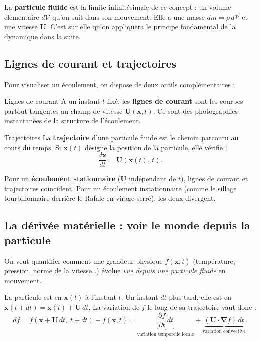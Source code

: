 \documentclass[11pt,a4paper]{report}
\newcommand{\pd}[2]{\dfrac{\partial #1}{\partial #2}}
\begin{document}
La \textbf{particule fluide} est la limite infinitésimale de ce concept : un volume
élémentaire $d\mathcal{V}$ qu'on suit dans son mouvement. Elle a une masse
$dm = \rho\,d\mathcal{V}$ et une vitesse $\bm{U}$. C'est sur elle qu'on appliquera
le principe fondamental de la dynamique dans la suite.

\subsection{Lignes de courant et trajectoires}

Pour visualiser un écoulement, on dispose de deux outils complémentaires :

\begin{defbox}{Lignes de courant}
À un instant $t$ fixé, les \textbf{lignes de courant} sont les courbes partout
tangentes au champ de vitesse $\bm{U}(\bm{x},t)$. Ce sont des photographies
instantanées de la structure de l'écoulement.
\end{defbox}

\begin{defbox}{Trajectoires}
La \textbf{trajectoire} d'une particule fluide est le chemin parcouru au cours du
temps. Si $\bm{x}(t)$ désigne la position de la particule, elle vérifie :
\[
    \frac{d\bm{x}}{dt} = \bm{U}\!\left(\bm{x}(t),\, t\right).
\]
\end{defbox}

Pour un \textbf{écoulement stationnaire} ($\bm{U}$ indépendant de $t$), lignes de
courant et trajectoires coïncident. Pour un écoulement instationnaire (comme le
sillage tourbillonnaire derrière le Rafale en virage serré), les deux divergent.

\subsection{La dérivée matérielle : voir le monde depuis la particule}

On veut quantifier comment une grandeur physique $f(\bm{x},t)$ (température,
pression, norme de la vitesse\ldots) évolue \textit{vue depuis une particule fluide}
en mouvement.

La particule est en $\bm{x}(t)$ à l'instant $t$. Un instant $dt$ plus tard, elle
est en $\bm{x}(t+dt) = \bm{x}(t) + \bm{U}\,dt$. La variation de $f$ le long de
sa trajectoire vaut donc :
\[
    df = f\!\left(\bm{x} + \bm{U}\,dt,\; t + dt\right) - f(\bm{x},t)
       = \underbrace{\pd{f}{t}\,dt}_{\text{variation temporelle locale}}
       + \underbrace{(\bm{U}\cdot\boldsymbol{\nabla} f)\,dt}_{\text{variation convective}}.
\]
\end{document}
